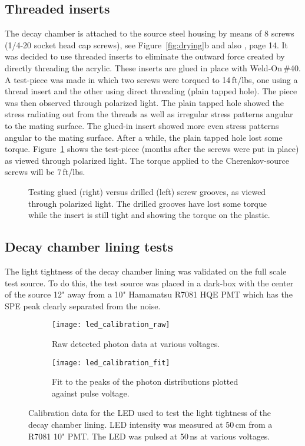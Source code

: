 \subsection{Threaded inserts}
\label{sec:inserts}
The decay chamber is attached to the source steel housing by means of 8 screws (1/4-20 socket head cap screws), see Figure~\ref{fig:drying}b and also \cite{wallig:2015}, page 14. It was decided to use threaded inserts to eliminate the outward force created by directly threading the acrylic. These inserts are glued in place with Weld-On\,\#40. A test-piece was made in which two screws were torqued to 14\,ft/lbs, one using a thread insert and the other using direct threading (plain tapped hole). The piece was then observed through polarized light. The plain tapped hole showed the stress radiating out from the threads as well as irregular stress patterns angular to the mating surface. The glued-in insert showed more even stress patterns angular to the mating surface. After a while, the plain tapped hole lost some torque. Figure~\ref{fig:nutts} shows the test-piece (months after the screws were put in place) as viewed through polarized light. The torque applied to the Cherenkov-source screws will be 7\,ft/lbs.

\begin{figure}
\caption{\label{fig:nutts} Testing glued (right) versus drilled (left) screw grooves, as viewed through polarized light. The drilled grooves have lost some torque while the insert is still tight and showing the torque on the plastic. }
\end{figure}

\subsection{Decay chamber lining tests}
\label{sec:liningtest}
The light tightness of the decay chamber lining was validated on the full scale test source. To do this, the test source was placed in a dark-box with the center of the source 12" away from a 10" Hamamatsu R7081 HQE PMT which has the SPE peak clearly separated from the noise. 
\begin{figure}
        \begin{subfigure}{0.49\textwidth}
                \texttt{[image: led\_calibration\_raw]}
                \caption{Raw detected photon data at various voltages.}
                \label{fig:ledRAW}
        \end{subfigure}%
        \hspace{0.2cm}
        \begin{subfigure}{0.49\textwidth}
                \texttt{[image: led\_calibration\_fit]}
                \caption{Fit to the peaks of the photon distributions plotted against pulse voltage.}
                \label{fig:ledFit}
        \end{subfigure}
        \caption{Calibration data for the LED used to test the light tightness of the decay chamber lining. LED intensity was measured at 50\,cm from a R7081 10" PMT. The LED was pulsed at 50\,ns at various voltages.}
\label{fig:calibratedled1}
\end{figure}

